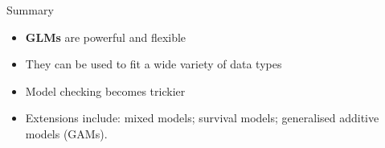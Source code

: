 \documentclass[pdf,handout]{beamer}
\begin{document}
\begin{frame}{Summary}

\begin{itemize}

\item \textbf{GLMs} are powerful and flexible
\vfill
\item They can be used to fit a wide variety of data types
\vfill
\item Model checking becomes trickier
\vfill
\item Extensions include: mixed models; survival models; generalised additive models (GAMs).
\end{itemize}

\end{frame}


\end{document}
